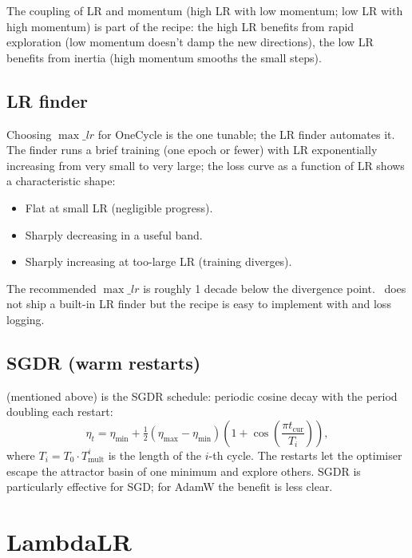 The coupling of LR and momentum (high LR with low momentum;
low LR with high momentum) is part of the recipe: the high LR
benefits from rapid exploration (low momentum doesn't damp the
new directions), the low LR benefits from inertia (high momentum
smooths the small steps).

\subsection{LR finder}
\label{ssec:lr_schedulers:lr_finder}

Choosing $\max\_lr$ for OneCycle is the one tunable; the LR
finder \cite{smith_one_cycle_2018} automates it. The finder
runs a brief training (one epoch or fewer) with LR exponentially
increasing from very small to very large; the loss curve as a
function of LR shows a characteristic shape:

\begin{itemize}
  \item Flat at small LR (negligible progress).
  \item Sharply decreasing in a useful band.
  \item Sharply increasing at too-large LR (training diverges).
\end{itemize}

The recommended $\max\_lr$ is roughly 1 decade below the
divergence point. \Lucid\ does not ship a built-in LR finder
but the recipe is easy to implement with
 and loss logging.

\subsection{SGDR (warm restarts)}
\label{ssec:lr_schedulers:sgdr}

 (mentioned above) is the
SGDR \cite{loshchilov_sgdr_2017} schedule: periodic cosine
decay with the period doubling each restart:
\[
  \eta_t = \eta_{\min} + \tfrac{1}{2}(\eta_{\max} - \eta_{\min})
  \left(1 + \cos\left(\frac{\pi t_{\text{cur}}}{T_i}\right)\right),
\]
where $T_i = T_0 \cdot T_{\text{mult}}^i$ is the length of the
$i$-th cycle. The restarts let the optimiser escape the
attractor basin of one minimum and explore others. SGDR is
particularly effective for SGD; for AdamW the benefit is less
clear.

\section{LambdaLR}
\label{sec:lr_schedulers:lambda}

